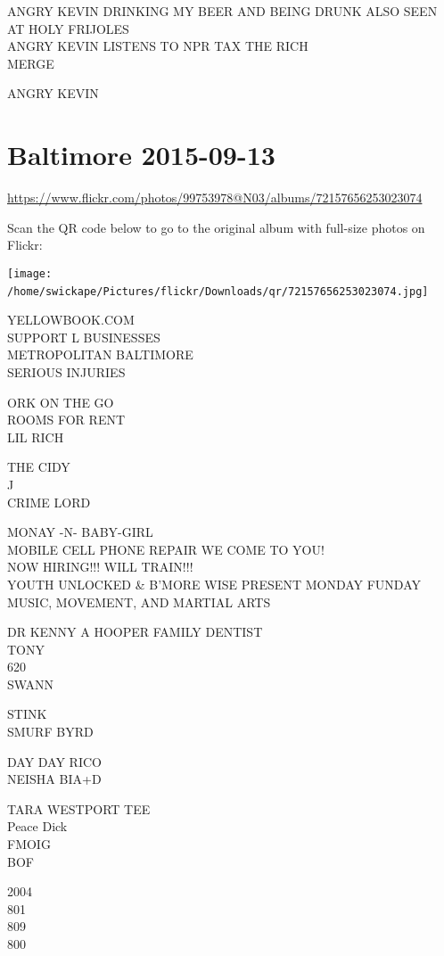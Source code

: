 \documentclass[10pt,letterpaper]{article}
\begin{document}
ANGRY KEVIN DRINKING MY BEER AND BEING DRUNK ALSO SEEN AT HOLY FRIJOLES\\
ANGRY KEVIN LISTENS TO NPR TAX THE RICH\\
MERGE

ANGRY KEVIN
\

\section*{Baltimore 2015-09-13}

\url{https://www.flickr.com/photos/99753978@N03/albums/72157656253023074}

Scan the QR code below to go to the original album with full-size photos on Flickr:

\texttt{[image: /home/swickape/Pictures/flickr/Downloads/qr/72157656253023074.jpg]}
\

YELLOWBOOK.COM\\
SUPPORT L BUSINESSES\\
METROPOLITAN BALTIMORE\\
SERIOUS INJURIES

ORK ON THE GO\\
ROOMS FOR RENT\\
LIL RICH

THE CIDY\\
J\\
CRIME LORD

MONAY {-}N{-} BABY{-}GIRL\\
MOBILE CELL PHONE REPAIR WE COME TO YOU!\\
NOW HIRING!!! WILL TRAIN!!!\\
YOUTH UNLOCKED \& B'MORE WISE PRESENT MONDAY FUNDAY MUSIC, MOVEMENT, AND MARTIAL ARTS

DR KENNY A HOOPER FAMILY DENTIST\\
TONY\\
620\\
SWANN

STINK\\
SMURF BYRD

DAY DAY RICO\\
NEISHA BIA+D

TARA WESTPORT TEE\\
Peace Dick\\
FMOIG\\
BOF

2004\\
801\\
809\\
800
\end{document}
